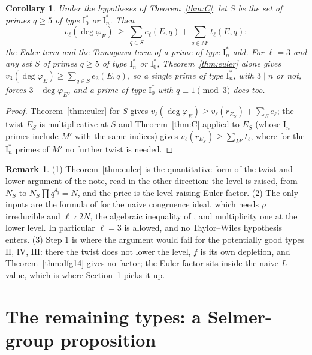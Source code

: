 \documentclass[11pt]{amsart}
\newtheorem{corollary}[theorem]{Corollary}
\theoremstyle{definition}
\newtheorem{remark}[theorem]{Remark}
\newcommand{\degphi}{\deg\varphi_E}\newcommand{\Gal}{\operatorname{Gal}}\newcommand{\ad}{\operatorname{ad}^0}
\begin{document}
\begin{corollary}\label{cor:both}
Under the hypotheses of Theorem~\ref{thm:C}, let $S$ be the set of primes $q\ge5$ of type $\mathrm{I}_0^*$ or $\mathrm{I}_n^*$. Then
\[
v_\ell(\degphi)\ \ge\ \sum_{q\in S}e_\ell(E,q)+\sum_{q\in M'}t_\ell(E,q):
\]
the Euler term and the Tamagawa term of a prime of type $\mathrm{I}_n^*$ add. For $\ell=3$ and any set $S$ of primes $q\ge5$ of type $\mathrm{I}_n^*$ or $\mathrm{I}_0^*$, Theorem~\ref{thm:euler} alone gives $v_3(\degphi)\ge\sum_{q\in S}e_3(E,q)$, so a single prime of type $\mathrm{I}_n^*$, with $3\mid n$ or not, forces $3\mid\degphi$, and a prime of type $\mathrm{I}_0^*$ with $q\equiv1\pmod3$ does too.
\end{corollary}
\begin{proof}
Theorem~\ref{thm:euler} for $S$ gives $v_\ell(\degphi)\ge v_\ell(r_{E_S})+\sum_S e_\ell$; the twist $E_S$ is multiplicative at $S$ and Theorem~\ref{thm:C} applied to $E_S$ (whose $\mathrm{I}_n$ primes include $M'$ with the same indices) gives $v_\ell(r_{E_S})\ge\sum_{M'}t_\ell$, where for the $\mathrm{I}_n^*$ primes of $M'$ no further twist is needed.
\end{proof}

\begin{remark}
(1) Theorem~\ref{thm:euler} is the quantitative form of the twist-and-lower argument of the note, read in the other direction: the level is raised, from $N_S$ to $N_S\prod q^{\delta_q}=N$, and the price is the level-raising Euler factor. (2) The only inputs are the formula of \cite{DFG04} for the naive congruence ideal, which needs $\bar\rho$ irreducible and $\ell\nmid 2N$, the algebraic inequality of \cite[Lemma 4.17]{DDT}, and multiplicity one at the lower level. In particular $\ell=3$ is allowed, and no Taylor--Wiles hypothesis enters. (3) Step 1 is where the argument would fail for the potentially good types $\mathrm{II}$, $\mathrm{IV}$, $\mathrm{III}$: there the twist does not lower the level, $f$ is its own depletion, and Theorem~\ref{thm:dfg14} gives no factor; the Euler factor sits inside the naive $L$-value, which is where Section~\ref{sec:prop} picks it up.
\end{remark}

\section{The remaining types: a Selmer-group proposition}\label{sec:prop}
\end{document}
